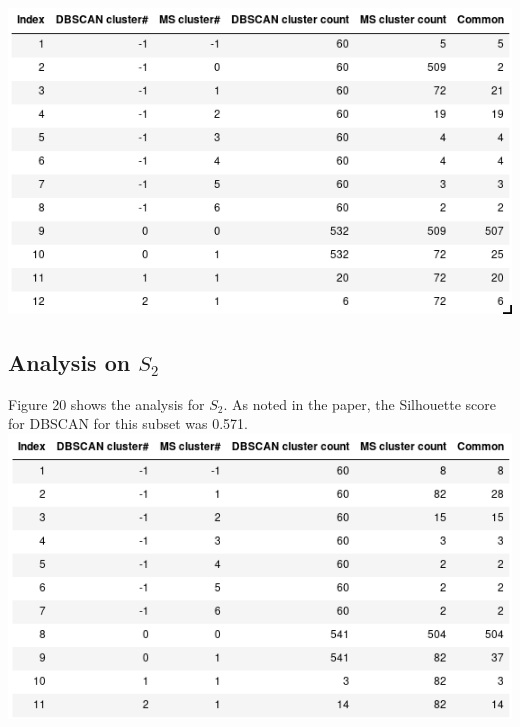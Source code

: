 \documentclass[12pt,a4paper]{article}
\begin{document}
\includegraphics[scale=0.65]{cluster_s1.png}
\begingroup
{}
\endgroup

\subsection{Analysis on $S_2$}
Figure 20 shows the analysis for $S_2$. As noted in the paper, the Silhouette score for DBSCAN for this subset was 0.571. \\

\includegraphics[scale=0.65]{clustering.png}
\begingroup
{}
\endgroup
\end{document}
